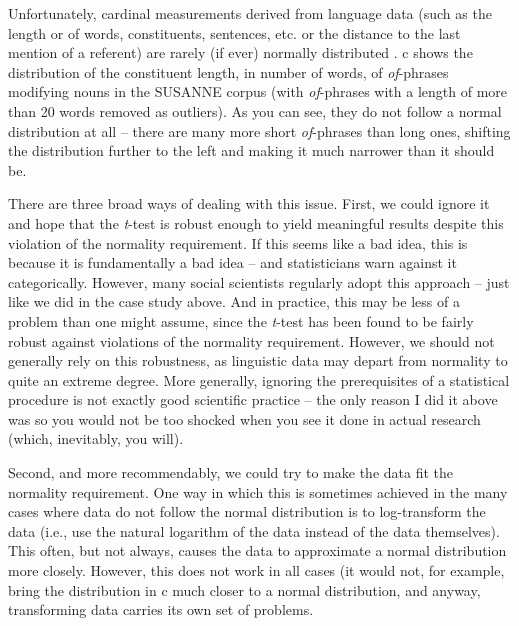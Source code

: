 Unfortunately, cardinal  measurements  derived from language data (such as the length  or of words, constituents, sentences, etc. or the distance  to the last mention of a referent) are rarely (if ever) normally distributed \citep[see, e.g.,][51]{mcenery_corpus_2012}. c shows the distribution of the constituent length,  in number of words, of \textit{of}-phrases modifying nouns  in the SUSANNE corpus (with \textit{of}-phrases with a length of more than 20 words removed as outliers). As you can see, they do not follow a normal distribution  at all -- there are many more short \textit{of}-phrases than long ones, shifting the distribution further to the left and making it much narrower than it should be.

There are three broad ways of dealing with this issue. First, we could ignore it and hope that the \textit{t}-test  is robust enough to yield meaningful results despite this violation of the normality requirement. If this seems like a bad idea, this is because it is fundamentally a bad idea -- and statisticians warn against it categorically.  However, many social scientists regularly adopt this approach -- just like we did in the case study above. And in practice, this may be less of a problem than one might assume, since the \textit{t}-test  has been found to be fairly robust against violations of the normality requirement. However, we should not generally rely on this robustness, as linguistic data may depart from normality to quite an extreme degree. More generally, ignoring the prerequisites of a statistical procedure is not exactly good scientific practice -- the only reason I did it above was so you would not be too shocked when you see it done in actual research (which, inevitably, you will).

Second, and more recommendably, we could try to make the data fit the normality requirement. One way in which this is sometimes achieved in the many cases where data do not follow the normal distribution  is to log\hyp{}transform the data (i.e., use the natural logarithm  of the data instead of the data themselves). This often, but not always, causes the data to approximate a normal distribution more closely. However, this does not work in all cases (it would not, for example, bring the distribution in c much closer to a normal distribution, and anyway, transforming data carries its own set of problems.

